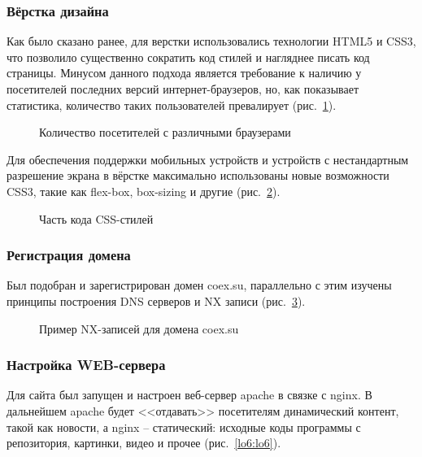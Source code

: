 \subsubsection{ Вёрстка дизайна } 

Как было сказано ранее, для верстки использовались технологии HTML5 и CSS3, что позволило существенно сократить код стилей и нагляднее писать код страницы. Минусом данного подхода является требование к наличию у посетителей последних версий интернет-браузеров, но, как показывает статистика, количество таких пользователей превалирует (рис.~\ref{lo3:lo3}).

\begin{figure}[h!]
\center{\texttt{[image: lo3]}}
\caption{ Количество посетителей с различными браузерами }
\label{lo3:lo3}
\end{figure}

Для обеспечения поддержки мобильных устройств и устройств с нестандартным разрешение экрана в вёрстке максимально использованы новые возможности CSS3, такие как flex-box, box-sizing и другие (рис.~\ref{lo4:lo4}).

\begin{figure}[h!]
\center{\texttt{[image: lo4]}}
\caption{ Часть кода CSS-стилей }
\label{lo4:lo4}
\end{figure}

\subsubsection{ Регистрация домена }

Был подобран и зарегистрирован домен coex.su, параллельно с этим изучены принципы построения DNS серверов и NX записи (рис.~\ref{lo5:lo5}).

\begin{figure}[h!]
\center{\texttt{[image: lo5]}}
\caption{ Пример NX-записей для домена coex.su }
\label{lo5:lo5}
\end{figure}

\subsubsection{ Настройка WEB-сервера }

Для сайта был запущен и настроен веб-сервер apache в связке с nginx. В дальнейшем apache будет <<отдавать>> посетителям динамический контент, такой как новости, а nginx – статический: исходные коды программы с репозитория, картинки, видео и прочее (рис.~\ref{lo6:lo6}).

